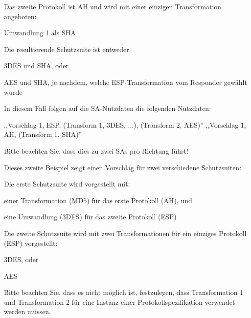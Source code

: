 \documentclass[a4paper]{article}
\begin{document}
\begin{multicols}{3}
\begin{itemize*}
\begin{itemize*}
\begin{itemize*}
                        \item Das zweite Protokoll ist AH und wird mit einer einzigen Transformation angeboten:
                        \begin{itemize*} \item Umwandlung 1 als SHA \end{itemize*}
                        \item Die resultierende Schutzsuite ist entweder
                        \begin{itemize*} \item 3DES und SHA, oder \item AES und SHA, je nachdem, welche ESP-Transformation vom Responder gewählt wurde \end{itemize*}
                        \item In diesem Fall folgen auf die SA-Nutzdaten die folgenden Nutzdaten:
                        \begin{itemize*} \item ,,Vorschlag 1, ESP, (Transform 1, 3DES, ...), (Transform 2, AES)'' ,,Vorschlag 1, AH, (Transform 1, SHA)'' \end{itemize*}
                        \item Bitte beachten Sie, dass dies zu zwei SAs pro Richtung führt!
                  \end{itemize*}
                  \item Dieses zweite Beispiel zeigt einen Vorschlag für zwei verschiedene
                  Schutzsuiten:
                  \begin{itemize*}
                        \item Die erste Schutzsuite wird vorgestellt mit:
                        \begin{itemize*} \item einer Transformation (MD5) für das erste Protokoll (AH), und \item eine Umwandlung (3DES) für das zweite Protokoll (ESP) \end{itemize*}
                        \item Die zweite Schutzsuite wird mit zwei Transformationen für ein einziges Protokoll (ESP) vorgestellt:
                        \begin{itemize*} \item 3DES, oder \item AES \end{itemize*}
                        \item Bitte beachten Sie, dass es nicht möglich ist, festzulegen, dass Transformation 1 und Transformation 2 für eine Instanz einer Protokollspezifikation verwendet werden müssen.

\end{itemize*}
\end{itemize*}
\end{itemize*}
\end{multicols}
\end{document}

